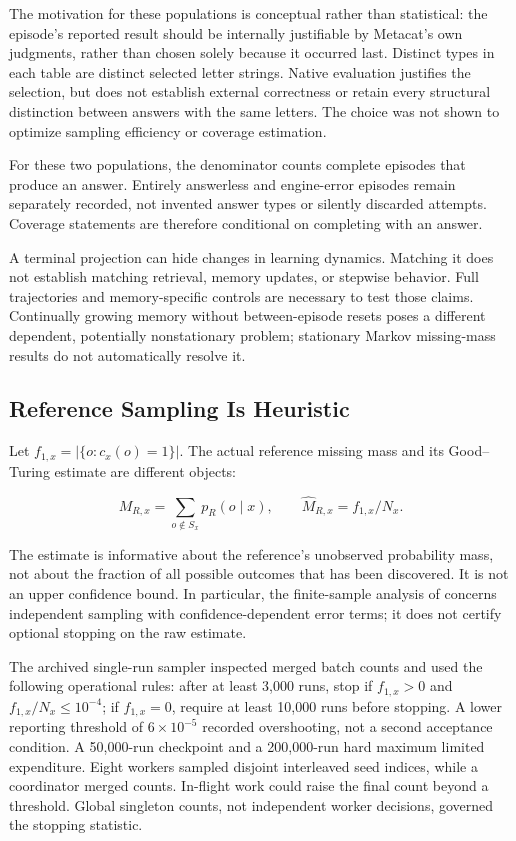 \documentclass[10pt,letterpaper]{article}
\begin{document}
The motivation for these populations is conceptual rather than statistical: the episode's
reported result should be internally justifiable by Metacat's own judgments, rather than
chosen solely because it occurred last. Distinct types in each table are distinct selected
letter strings. Native evaluation justifies the selection, but does not establish external
correctness or retain every structural distinction between answers with the same letters.
The choice was not shown to optimize sampling efficiency or coverage estimation.

For these two populations, the denominator counts complete episodes that produce an
answer. Entirely answerless and engine-error episodes remain separately recorded, not
invented answer types or silently discarded attempts. Coverage statements are therefore
conditional on completing with an answer.

A terminal projection can hide changes in learning dynamics. Matching it does not
establish matching retrieval, memory updates, or stepwise behavior. Full trajectories and
memory-specific controls are necessary to test those claims. Continually growing memory
without between-episode resets poses a different dependent, potentially nonstationary
problem; stationary Markov missing-mass results \citep{ref35} do not automatically resolve
it.

\subsection{Reference Sampling Is Heuristic}\label{sec:stopping}

Let \(f_{1,x}=|\{o:c_x(o)=1\}|\). The actual reference missing mass and its Good--Turing
estimate are different objects:

\[
M_{R,x}=\sum_{o\notin S_x}p_R(o\mid x),\qquad
\widehat M_{R,x}=f_{1,x}/N_x.
\]

The estimate is informative about the reference's unobserved probability mass, not about
the fraction of all possible outcomes that has been discovered. It is not an upper
confidence bound. In particular, the finite-sample analysis of \citet{ref10} concerns
independent sampling with confidence-dependent error terms; it does not certify optional
stopping on the raw estimate.

The archived single-run sampler inspected merged batch counts and used the following
operational rules: after at least 3,000 runs, stop if \(f_{1,x}>0\) and
\(f_{1,x}/N_x\le 10^{-4}\); if \(f_{1,x}=0\), require at least 10,000 runs before
stopping. A lower reporting threshold of \(6\times10^{-5}\) recorded overshooting, not a
second acceptance condition. A 50,000-run checkpoint and a 200,000-run hard maximum
limited expenditure. Eight workers sampled disjoint interleaved seed indices, while a
coordinator merged counts. In-flight work could raise the final count beyond a threshold.
Global singleton counts, not independent worker decisions, governed the stopping
statistic.
\end{document}
